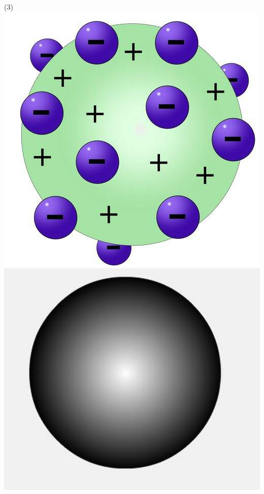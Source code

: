 \documentclass[11pt]{article}
\begin{document}
\begin{exercise}
\begin{choice}(3)
\choice \includegraphics[scale=.6]{Adaptadas/thomson.jpg}
\choice \includegraphics[scale=.1]{Adaptadas/bilhar.png}

\end{choice}
\end{exercise}
\end{document}

